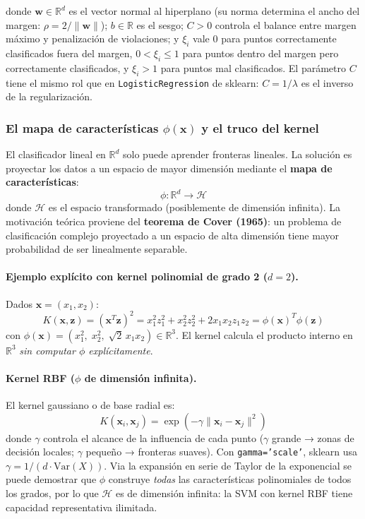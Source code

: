 \documentclass[spanish]{article}
\begin{document}
donde $\mathbf{w} \in \mathbb{R}^d$ es el vector normal al hiperplano (su norma determina el ancho del margen: $\rho = 2/\|\mathbf{w}\|$); $b \in \mathbb{R}$ es el sesgo; $C > 0$ controla el balance entre margen máximo y penalización de violaciones; y $\xi_i$ vale 0 para puntos correctamente clasificados fuera del margen, $0 < \xi_i \leq 1$ para puntos dentro del margen pero correctamente clasificados, y $\xi_i > 1$ para puntos mal clasificados. El parámetro $C$ tiene el mismo rol que en \texttt{LogisticRegression} de sklearn: $C = 1/\lambda$ es el inverso de la regularización.

\subsubsection{El mapa de características $\phi(\mathbf{x})$ y el truco del kernel}

El clasificador lineal en $\mathbb{R}^d$ solo puede aprender fronteras lineales. La solución es proyectar los datos a un espacio de mayor dimensión mediante el \textbf{mapa de características}:
\begin{equation}
\phi: \mathbb{R}^d \longrightarrow \mathcal{H}
\end{equation}
donde $\mathcal{H}$ es el espacio transformado (posiblemente de dimensión infinita). La motivación teórica proviene del \textbf{teorema de Cover (1965)}: un problema de clasificación complejo proyectado a un espacio de alta dimensión tiene mayor probabilidad de ser linealmente separable.

\paragraph{Ejemplo explícito con kernel polinomial de grado 2 ($d=2$).} Dados $\mathbf{x} = (x_1, x_2)$:
\begin{equation}
K(\mathbf{x}, \mathbf{z}) = (\mathbf{x}^T \mathbf{z})^2 = x_1^2 z_1^2 + x_2^2 z_2^2 + 2 x_1 x_2 z_1 z_2 = \phi(\mathbf{x})^T\phi(\mathbf{z})
\end{equation}
con $\phi(\mathbf{x}) = (x_1^2,\; x_2^2,\; \sqrt{2}\, x_1 x_2) \in \mathbb{R}^3$. El kernel calcula el producto interno en $\mathbb{R}^3$ \emph{sin computar $\phi$ explícitamente}.

\paragraph{Kernel RBF ($\phi$ de dimensión infinita).} El kernel gaussiano o de base radial es:
\begin{equation}
K(\mathbf{x}_i, \mathbf{x}_j) = \exp\!\left(-\gamma \|\mathbf{x}_i - \mathbf{x}_j\|^2\right)
\end{equation}
donde $\gamma$ controla el alcance de la influencia de cada punto ($\gamma$ grande → zonas de decisión locales; $\gamma$ pequeño → fronteras suaves). Con \texttt{gamma='scale'}, sklearn usa $\gamma = 1/(d \cdot \mathrm{Var}(X))$. Via la expansión en serie de Taylor de la exponencial se puede demostrar que $\phi$ construye \emph{todas} las características polinomiales de todos los grados, por lo que $\mathcal{H}$ es de dimensión infinita: la SVM con kernel RBF tiene capacidad representativa ilimitada.
\end{document}
